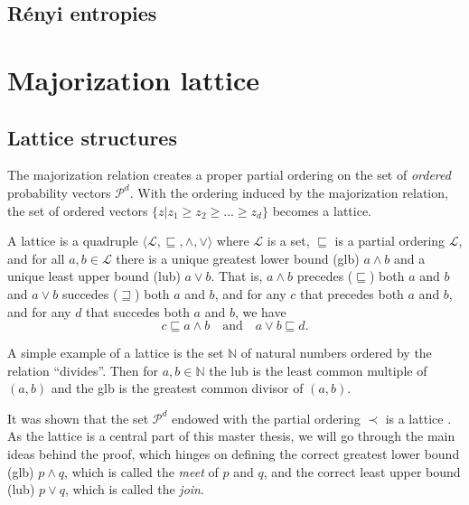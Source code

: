 \subsection{Rényi entropies}





\section{Majorization lattice} \label{sec:majorization_lattice}

\subsection{Lattice structures}

The majorization relation creates a proper partial ordering on the set of \textit{ordered} probability vectors $\mathcal{P}^d$. With the ordering induced by the majorization relation, the set of ordered vectors $\{z | z_1 \geq z_2 \geq ... \geq z_d\}$ becomes a lattice.

\begin{definition}[Lattice] \label{def:lattice} %
    A lattice is a quadruple $\langle \mathcal{L}, \sqsubseteq, \wedge, \vee \rangle$ where $\mathcal{L}$ is a set, $\sqsubseteq$ is a partial ordering $\mathcal{L}$, and for all $a, b \in \mathcal{L}$ there is a unique greatest lower bound (glb) $a \wedge b$ and a unique least upper bound (lub) $a \vee b$. That is, $a \wedge b$ precedes ($\sqsubseteq$) both $a$ and $b$ and $a \vee b$ succedes ($\sqsupseteq$) both $a$ and $b$, and for any $c$ that precedes both $a$ and $b$, and for any $d$ that succedes both $a$ and $b$, we have
    \begin{equation}
        c \sqsubseteq a \wedge b \quad \text{and} \quad a \vee b \sqsubseteq d.
    \end{equation}
\end{definition}

A simple example of a lattice is the set $\mathbb{N}$ of natural numbers ordered by the relation “divides”. Then for $a, b \in \mathbb{N}$ the lub is the least common multiple of $(a, b)$ and the glb is the greatest common divisor of $(a, b)$. %

It was shown that the set $\mathcal{P}^d$ endowed with the partial ordering $\prec$ is a lattice \cite{cicalese_supermodularity_2002}. As the lattice is a central part of this master thesis, we will go through the main ideas behind the proof, which hinges on defining the correct greatest lower bound (glb) $p \wedge q$, which is called the \textit{meet} of $p$ and $q$, and the correct least upper bound (lub) $p \vee q$, which is called the \textit{join}.

